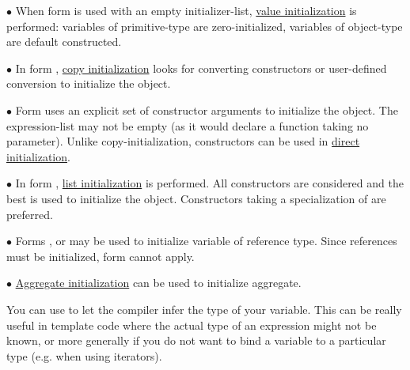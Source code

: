 \documentclass[10pt,landscape,a4paper]{article}
\begin{document}
\begin{multicols*}{3}

$ \bullet $ When form  is used with an empty initializer-list, 
\href{https://en.cppreference.com/w/cpp/language/value_initialization}{value initialization} 
is performed: variables of primitive-type are zero-initialized, variables of object-type are default constructed.


$ \bullet $ In form , \href{https://en.cppreference.com/w/cpp/language/copy_initialization}{copy initialization} 
looks for converting constructors or user-defined conversion to initialize the object. 


$ \bullet $ Form  uses an explicit set of constructor arguments to initialize the object. 
The expression-list may not be empty (as it would declare a function taking no parameter).
Unlike copy-initialization,  constructors can be used in 
\href{https://en.cppreference.com/w/cpp/language/direct_initialization}{direct initialization}.


$ \bullet $ In form ,
\href{https://en.cppreference.com/w/cpp/language/list_initialization}{list initialization} 
is performed. All constructors are considered and the best is used to initialize the object. 
Constructors taking a specialization of  
are preferred. 


$ \bullet $ Forms ,  or  may be used to initialize variable of reference type.
Since references must be initialized, form  cannot apply.


$ \bullet $ \href{https://en.cppreference.com/w/cpp/language/aggregate_initialization}{Aggregate initialization} can be used 
to initialize aggregate.


You can use  to let the compiler infer the type of your variable.
This can be really useful in template code where the actual type of an expression 
might not be known, or more generally if you do not want to bind a variable to a 
particular type (e.g. when using iterators).


\end{multicols*}
\end{document}
